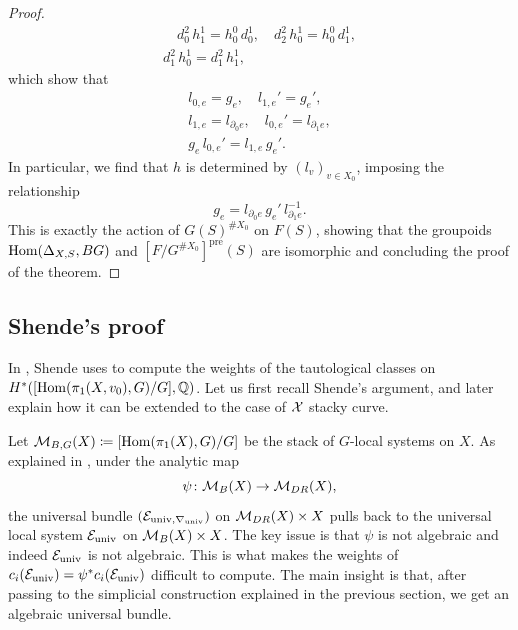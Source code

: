 \begin{proof}
\begin{gather}
\quad d_0^2 \, h_1^1 = h_0^0 \, d_0^1, \quad d_2^2 \, h_0^1 = h_0^0 \, d_1^1,\\
d_1^2 \, h_0^1 = d_1^2 \, h_1^1,
\end{gather}
which show that
\begin{gather}
l_{0,e}= g_e, \quad l_{1,e}' = g_e',\\
l_{1,e}= l_{\partial_0 e}, \quad l_{0, e}' = l_{\partial_1 e}, \\
g_e \, l_{0,e}' = l_{1, e} \, g_{e}'.
\end{gather}
In particular, we find that $h$ is determined by $(l_v)_{v \in X_0}$, imposing the relationship
\begin{equation}
g_{e} = l_{\partial_0 e} \, g_e' \, l_{\partial_1 e}^{-1}.
\end{equation}
This is exactly the action of $G(S)^{\# X_0}$ on $F(S)$, showing that the groupoids $\operatorname{Hom}(\Delta_{X, S}, BG)$ and $\left[ F / G^{\# X_0} \right]^{\text{pre}}(S)$ are isomorphic and concluding the proof of the theorem.
\end{proof}

\subsection{Shende's proof} \label{subsection: SHende's proof}
In \cite{Shende-weights}, Shende uses  to compute the weights of the tautological classes on $H^*([\operatorname{Hom}(\pi_1(X, v_0), G) / G], \mathbb{Q})$. Let us first recall Shende's argument, and later explain how it can be extended to the case of $\mathcal{X}$ stacky curve.

Let $\mathcal{M}_{B,G}(X) \coloneqq \left[ \operatorname{Hom}(\pi_1(X), G) / G \right]$ be the stack of $G$-local systems on $X$.
As explained in , under the analytic map
\begin{equation}
\psi \colon \mathcal{M}_B(X) \to \mathcal{M}_{DR}(X),
\end{equation}
the universal bundle $(\mathcal{E}_{\text{univ}, \nabla_{\text{univ}}})$ on $\mathcal{M}_{DR}(X) \times X$ pulls back to the universal local system $\mathcal{E}_{\text{univ}}$ on $\mathcal{M}_{B}(X) \times X$. The key issue is that $\psi$ is not algebraic and indeed $\mathcal{E}_{\text{{univ}}}$ is not algebraic. This is what makes the weights of $c_i(\mathcal{E}_{\text{univ}})=\psi^* c_i(\mathcal{E}_{\text{univ}})$ difficult to compute. The main insight is that, after passing to the simplicial construction explained in the previous section, we get an algebraic universal bundle.

